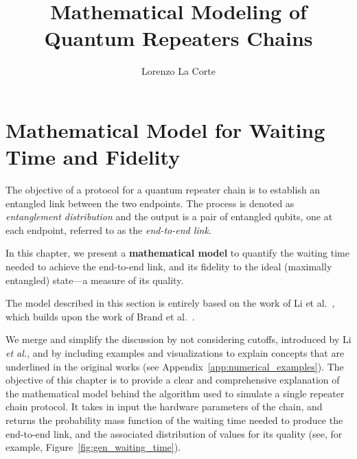 \documentclass{masterthesis}
\begin{document}
\title{Mathematical Modeling of Quantum Repeaters Chains}

\author{Lorenzo La Corte}

\advisor{}

\examiner{}

\maketitle

\tableofcontents


\chapter{Mathematical Model for Waiting Time and Fidelity}

The objective of a protocol for a quantum repeater chain is to establish an entangled link between the two endpoints. The process is denoted as \textit{entanglement distribution} and the output is a pair of entangled qubits, one at each endpoint, referred to as the \textit{end-to-end link}.

In this chapter, we present a \textbf{mathematical model} to quantify the waiting time needed to achieve the end-to-end link, and its fidelity to the ideal (maximally entangled) state---a measure of its quality.

The model described in this section is entirely based on the work of Li et al.~\cite{Li_2021}, which builds upon the work of Brand et al.~\cite{Brand_2020}.

We merge and simplify the discussion by not considering cutoffs, introduced by Li \textit{et al.}, and by including examples and visualizations to explain concepts that are underlined in the original works (see Appendix~\ref{app:numerical_examples}).
The objective of this chapter is to provide a clear and comprehensive explanation of the mathematical model behind the algorithm used to simulate a single repeater chain protocol. It takes in input the hardware parameters of the chain, and returns the probability mass function of the waiting time needed to produce the end-to-end link, and the associated distribution of values for its quality (see, for example, Figure~\ref{fig:gen_waiting_time}). %
\end{document}
